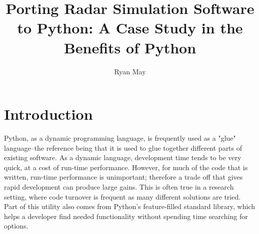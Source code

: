 \documentclass[twocolumn]{article}
\title{Porting Radar Simulation Software to Python: A Case Study in the Benefits of Python}
\author{Ryan May}
\affil{Enterprise Electronics Corporation\\Norman, OK}
\date{}
\begin{document}
\maketitle



\section{Introduction}
Python, as a dynamic programming language, is frequently used as a "glue"
language--the reference being that it is used to glue together different parts
of existing software. As a dynamic language, development time tends to be very
quick, at a cost of run-time performance. However, for much of the code that is
written, run-time performance is unimportant; therefore a trade off that
gives rapid development can produce large gains. This is often true in a research
setting, where code turnover is frequent as many different solutions are tried.
Part of this utility also comes from Python's feature-filled standard library,
which helps a developer find needed functionality without spending time
searching for options.
\end{document}
